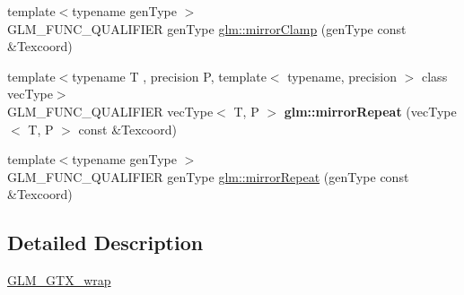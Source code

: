\begin{DoxyCompactItemize}
{\footnotesize template$<$typename gen\+Type $>$ }\\G\+L\+M\+\_\+\+F\+U\+N\+C\+\_\+\+Q\+U\+A\+L\+I\+F\+I\+ER gen\+Type \hyperlink{group__gtx__wrap_gaa6856a0a048d2749252848da35e10c8b}{glm\+::mirror\+Clamp} (gen\+Type const \&Texcoord)
\item 
\mbox{\label{wrap_8inl_a66dd644db202199824250c457b844179}} 
{\footnotesize template$<$typename T , precision P, template$<$ typename, precision $>$ class vec\+Type$>$ }\\G\+L\+M\+\_\+\+F\+U\+N\+C\+\_\+\+Q\+U\+A\+L\+I\+F\+I\+ER vec\+Type$<$ T, P $>$ {\bfseries glm\+::mirror\+Repeat} (vec\+Type$<$ T, P $>$ const \&Texcoord)
\item 
{\footnotesize template$<$typename gen\+Type $>$ }\\G\+L\+M\+\_\+\+F\+U\+N\+C\+\_\+\+Q\+U\+A\+L\+I\+F\+I\+ER gen\+Type \hyperlink{group__gtx__wrap_ga16a89b0661b60d5bea85137bbae74d73}{glm\+::mirror\+Repeat} (gen\+Type const \&Texcoord)
\end{DoxyCompactItemize}


\subsection{Detailed Description}
\hyperlink{group__gtx__wrap}{G\+L\+M\+\_\+\+G\+T\+X\+\_\+wrap} 